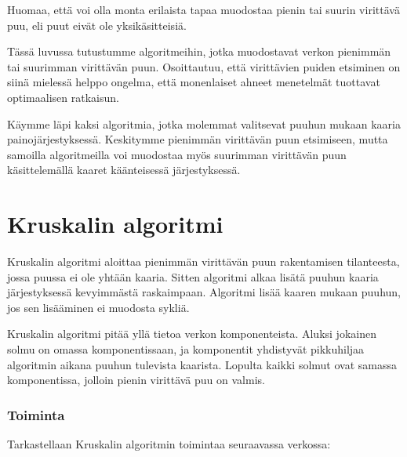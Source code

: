 Huomaa, että voi olla monta erilaista
tapaa muodostaa pienin tai
suurin virittävä puu, eli puut eivät ole yksikäsitteisiä.

Tässä luvussa tutustumme algoritmeihin,
jotka muodostavat verkon pienimmän tai suurimman
virittävän puun.
Osoittautuu, että virittävien puiden etsiminen
on siinä mielessä helppo ongelma,
että monenlaiset ahneet menetelmät tuottavat
optimaalisen ratkaisun.

Käymme läpi kaksi algoritmia, jotka molemmat valitsevat
puuhun mukaan kaaria painojärjestyksessä.
Keskitymme pienimmän virittävän puun etsimiseen,
mutta samoilla algoritmeilla voi muodostaa myös suurimman virittävän
puun käsittelemällä kaaret käänteisessä järjestyksessä.

\section{Kruskalin algoritmi}


Kruskalin algoritmi aloittaa pienimmän
virittävän
puun rakentamisen tilanteesta,
jossa puussa ei ole yhtään kaaria.
Sitten algoritmi alkaa lisätä
puuhun kaaria järjestyksessä
kevyimmästä raskaimpaan.
Algoritmi lisää kaaren mukaan puuhun,
jos sen lisääminen ei muodosta sykliä.

Kruskalin algoritmi pitää yllä
tietoa verkon komponenteista.
Aluksi jokainen solmu on omassa
komponentissaan,
ja komponentit yhdistyvät pikkuhiljaa
algoritmin aikana puuhun tulevista kaarista.
Lopulta kaikki solmut ovat samassa
komponentissa, jolloin pienin virittävä puu on valmis.

\subsubsection{Toiminta}

\begin{samepage}
Tarkastellaan Kruskalin algoritmin toimintaa
seuraavassa verkossa:
\begin{center}
\end{center}
\end{samepage}

